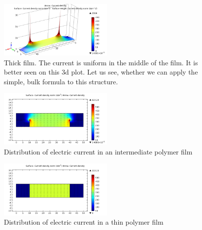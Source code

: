 \begin{figure} [!ht]
\begin{center}
       \includegraphics[width=0.5\textwidth]{./edmr/fingers1/pics/3_thick_film_2.png}
       \end{center}
\caption{Thick film. The current is uniform in the middle of the film. It is better seen on this 3d plot. Let us see, whether we can apply the simple, bulk formula to this structure. }
     \label{fig:dits_thick_3d}
\end{figure}


\begin{figure} [!ht]
\begin{center}
       \includegraphics[width=0.5\textwidth]{./edmr/fingers1/pics/2_intermediate_film.png}
       \end{center}
\caption{Distribution of electric current in an intermediate polymer film}
     \label{fig:dits_inter}
\end{figure}

\begin{figure} [!ht]
\begin{center}
       \includegraphics[width=0.5\textwidth]{./edmr/fingers1/pics/1_thin_film.png}
       \end{center}
\caption{Distribution of electric current in a thin polymer film}
     \label{fig:dits_thin}
\end{figure}

